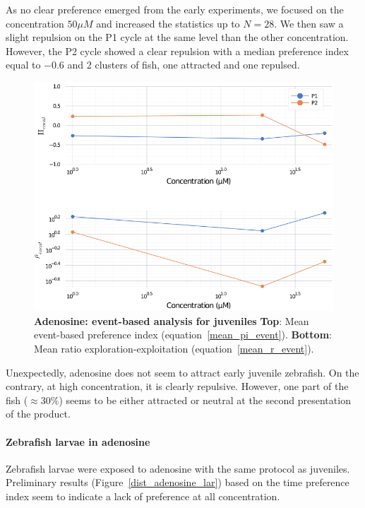  As no clear preference emerged from the early experiments, we focused on the concentration $50 \mu M$ and increased the statistics up to $N=28$. We then saw a slight repulsion on the P1 cycle at the same level than the other concentration. However, the P2 cycle showed a clear repulsion with a median preference index equal to $-0.6$ and 2 clusters of fish, one attracted and one repulsed.

    \begin{figure}[h!]
      \centering
      \includegraphics[width=1\textwidth]{part_2/assets/adenosine_event.png}
      \caption{\textbf{Adenosine: event-based analysis for juveniles} \textbf{Top}: Mean event-based preference index (equation~\ref{mean_pi_event}). \textbf{Bottom}: Mean ratio exploration-exploitation (equation~\ref{mean_r_event}).}
      \label{adenosine_event}
    \end{figure}

  Unexpectedly, adenosine does not seem to attract early juvenile zebrafish. On the contrary, at high concentration, it is clearly repulsive. However, one part of the fish ($\approx 30 \%$) seems to be either attracted or neutral at the second presentation of the product.

  \paragraph{Zebrafish larvae in adenosine} Zebrafish larvae were exposed to adenosine with the same protocol as juveniles. Preliminary results (Figure~\ref{dist_adenosine_lar}) based on the time preference index seem to indicate a lack of preference at all concentration.

